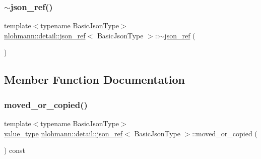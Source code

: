 \mbox{\label{classnlohmann_1_1detail_1_1json__ref_a8bcd4cfcafe952ce5140f8cb35ebe2f6}} 
\subsubsection{\texorpdfstring{$\sim$json\+\_\+ref()}{~json\_ref()}}
{\footnotesize\ttfamily template$<$typename Basic\+Json\+Type$>$ \\
\hyperlink{classnlohmann_1_1detail_1_1json__ref}{nlohmann\+::detail\+::json\+\_\+ref}$<$ Basic\+Json\+Type $>$\+::$\sim$\hyperlink{classnlohmann_1_1detail_1_1json__ref}{json\+\_\+ref} (\begin{DoxyParamCaption}{ }\end{DoxyParamCaption})\hspace{0.3cm}{\ttfamily [default]}}



\subsection{Member Function Documentation}
\mbox{\label{classnlohmann_1_1detail_1_1json__ref_ae39e523218bf05cac3fb5b5b1cd5efb6}} 
\subsubsection{\texorpdfstring{moved\+\_\+or\+\_\+copied()}{moved\_or\_copied()}}
{\footnotesize\ttfamily template$<$typename Basic\+Json\+Type$>$ \\
\hyperlink{classnlohmann_1_1detail_1_1json__ref_a78d76cf288141049568c0d670ed670ef}{value\+\_\+type} \hyperlink{classnlohmann_1_1detail_1_1json__ref}{nlohmann\+::detail\+::json\+\_\+ref}$<$ Basic\+Json\+Type $>$\+::moved\+\_\+or\+\_\+copied (\begin{DoxyParamCaption}{ }\end{DoxyParamCaption}) const\hspace{0.3cm}{\ttfamily [inline]}}

